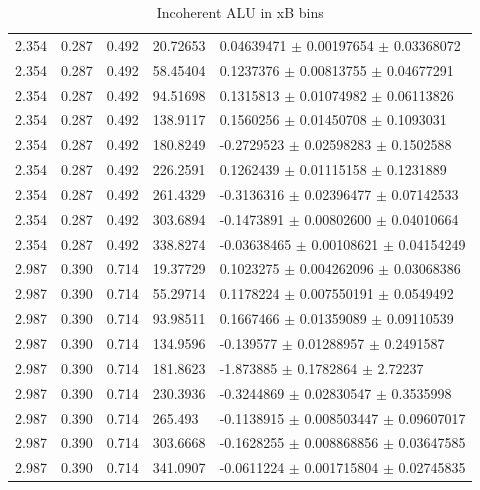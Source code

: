 \begin{table}[!h]
\begin{center}
\begin{tabular}{||l|l|l|l|l||}
         \hline
   2.354 & 0.287 & 0.492 & 20.72653 & 0.04639471  $\pm$    0.00197654  $\pm$  
0.03368072   \\
   2.354 & 0.287 & 0.492 & 58.45404 & 0.1237376   $\pm$    0.00813755  $\pm$  0.04677291   \\
   2.354 & 0.287 & 0.492 & 94.51698 & 0.1315813   $\pm$    0.01074982  $\pm$  0.06113826   \\
   2.354 & 0.287 & 0.492 & 138.9117 & 0.1560256   $\pm$    0.01450708  $\pm$  0.1093031    \\
   2.354 & 0.287 & 0.492 & 180.8249 & -0.2729523  $\pm$    0.02598283  $\pm$  0.1502588    \\
   2.354 & 0.287 & 0.492 & 226.2591 & 0.1262439   $\pm$    0.01115158  $\pm$  0.1231889    \\
   2.354 & 0.287 & 0.492 & 261.4329 & -0.3136316  $\pm$    0.02396477  $\pm$  0.07142533   \\
   2.354 & 0.287 & 0.492 & 303.6894 & -0.1473891  $\pm$    0.00802600  $\pm$  0.04010664   \\
   2.354 & 0.287 & 0.492 & 338.8274 & -0.03638465 $\pm$    0.00108621  $\pm$  0.04154249   \\

  
         \hline
   2.987 & 0.390 & 0.714 & 19.37729 & 0.1023275  $\pm$   0.004262096  $\pm$   
0.03068386   \\
   2.987 & 0.390 & 0.714 & 55.29714 & 0.1178224  $\pm$   0.007550191  $\pm$   0.0549492    \\
   2.987 & 0.390 & 0.714 & 93.98511 & 0.1667466  $\pm$   0.01359089   $\pm$   0.09110539   \\
   2.987 & 0.390 & 0.714 & 134.9596 & -0.139577  $\pm$   0.01288957   $\pm$   0.2491587    \\
   2.987 & 0.390 & 0.714 & 181.8623 & -1.873885  $\pm$   0.1782864    $\pm$   2.72237      \\
   2.987 & 0.390 & 0.714 & 230.3936 & -0.3244869 $\pm$   0.02830547   $\pm$   0.3535998    \\
   2.987 & 0.390 & 0.714 & 265.493  &-0.1138915  $\pm$   0.008503447  $\pm$   0.09607017   \\
   2.987 & 0.390 & 0.714 & 303.6668 & -0.1628255 $\pm$   0.008868856  $\pm$   0.03647585   \\
   2.987 & 0.390 & 0.714 & 341.0907 & -0.0611224 $\pm$   0.001715804  $\pm$   0.02745835   \\

         \hline
         \hline
      \end{tabular}
      \caption{Incoherent ALU in xB bins}
      \label{table:InCoh_xB_BSA}
   \end{center}
\end{table}



